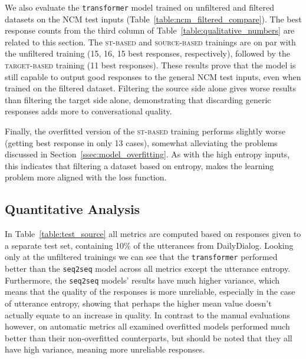 \documentclass[11pt,a4paper]{article}
\begin{document}
We also evaluate the \texttt{transformer} model trained on unfiltered and filtered datasets on the NCM test inputs (Table~\ref{table:ncm_filtered_compare}). The best response counts from the third column of Table~\ref{table:qualitative_numbers} are related to this section. The \textsc{st-based} and \textsc{source-based}
trainings are on par with the unfiltered training (15, 16, 15 best responses, respectively), followed by the \textsc{target-based} training (11 best responses). These results prove that the model is still capable to
output good responses to the general NCM test inputs, even when trained on the
filtered dataset. Filtering the source side alone gives worse results than filtering the target side alone, demonstrating that discarding generic responses adds more to conversational quality.

Finally, the overfitted version of the \textsc{st-based} training
performs slightly worse (getting best response in only 13 cases), somewhat alleviating the problems discussed in Section~\ref{ssec:model_overfitting}. As with the high entropy inputs, this indicates that filtering a dataset based on entropy, makes the learning problem more
aligned with the loss function.



\subsection{Quantitative Analysis}
\label{ssec:qa}

In Table~\ref{table:test_source} all metrics are computed based on responses given to a separate test set, containing 10\(\%\) of the utterances from DailyDialog. Looking only at the unfiltered trainings we can see that the \texttt{transformer} performed better than the \texttt{seq2seq} model across all metrics except the utterance entropy. Furthermore, the \texttt{seq2seq} models' results have much higher variance, which means that the quality of the responses is more unreliable, especially in the case of utterance entropy, showing that perhaps the higher mean value doesn't actually equate to an increase in quality. In contrast to the manual evaluations however, on automatic metrics all examined overfitted models performed much better than their non-overfitted counterparts, but should be noted that they all have high variance, meaning more unreliable responses.
\end{document}
